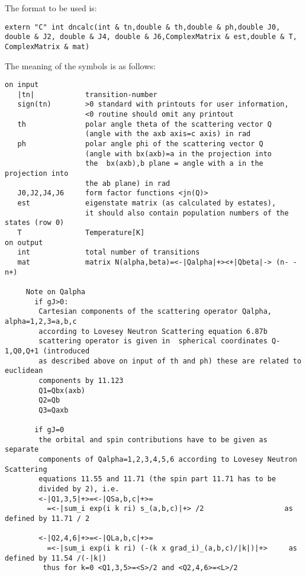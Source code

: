 The format to be used is:
{\footnotesize
\begin{verbatim}
extern "C" int dncalc(int & tn,double & th,double & ph,double J0,
double & J2, double & J4, double & J6,ComplexMatrix & est,double & T,
ComplexMatrix & mat)
\end{verbatim}

The meaning of the symbols is as follows:

\begin{verbatim}
on input
   |tn|            transition-number  
   sign(tn)        >0 standard with printouts for user information, 
                   <0 routine should omit any printout
   th              polar angle theta of the scattering vector Q 
                   (angle with the axb axis=c axis) in rad
   ph              polar angle phi of the scattering vector Q 
                   (angle with bx(axb)=a in the projection into
                   the  bx(axb),b plane = angle with a in the projection into 
				   the ab plane) in rad
   J0,J2,J4,J6     form factor functions <jn(Q)>   
   est             eigenstate matrix (as calculated by estates),
                   it should also contain population numbers of the states (row 0)
   T               Temperature[K]
on output
   int             total number of transitions
   mat             matrix N(alpha,beta)=<-|Qalpha|+><+|Qbeta|-> (n- - n+)
                   
     Note on Qalpha
       if gJ>0:
        Cartesian components of the scattering operator Qalpha, alpha=1,2,3=a,b,c
        according to Lovesey Neutron Scattering equation 6.87b 
        scattering operator is given in  spherical coordinates Q-1,Q0,Q+1 (introduced
        as described above on input of th and ph) these are related to euclidean 
		components by 11.123
        Q1=Qbx(axb)
        Q2=Qb                         
        Q3=Qaxb    
                   
       if gJ=0 
        the orbital and spin contributions have to be given as separate 
		components of Qalpha=1,2,3,4,5,6 according to Lovesey Neutron Scattering 
		equations 11.55 and 11.71 (the spin part 11.71 has to be
        divided by 2), i.e.
        <-|Q1,3,5|+>=<-|QSa,b,c|+>=
          =<-|sum_i exp(i k ri) s_(a,b,c)|+> /2                   as defined by 11.71 / 2
				   
        <-|Q2,4,6|+>=<-|QLa,b,c|+>=
          =<-|sum_i exp(i k ri) (-(k x grad_i)_(a,b,c)/|k|)|+>     as defined by 11.54 /(-|k|)
	     thus for k=0 <Q1,3,5>=<S>/2 and <Q2,4,6>=<L>/2 
				
\end{verbatim}
}

